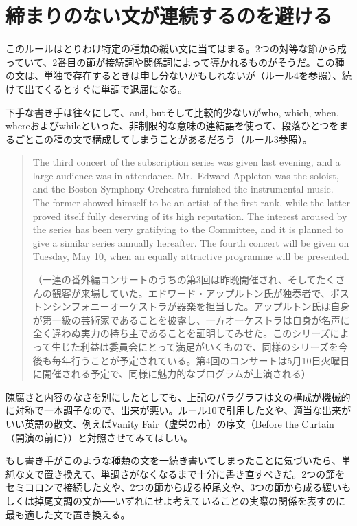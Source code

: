 \section{締まりのない文が連続するのを避ける}
このルールはとりわけ特定の種類の緩い文に当てはまる。2つの対等な節から成っていて、2番目の節が接続詞や関係詞によって導かれるものがそうだ。この種の文は、単独で存在するときは申し分ないかもしれないが（ルール4を参照）、続けて出てくるとすぐに単調で退屈になる。
\par
下手な書き手は往々にして、and, butそして比較的少ないがwho, which, when, whereおよびwhileといった、非制限的な意味の連結語を使って、段落ひとつをまるごとこの種の文で構成してしまうことがあるだろう（ルール3参照）。
\begin{quote}
The third concert of the subscription series was given last
evening, and a large audience was in attendance. Mr.~Edward Appleton was
the soloist, and the Boston Symphony Orchestra furnished the
instrumental music. The former showed himself to be an artist of the
first rank, while the latter proved itself fully deserving of its high
reputation. The interest aroused by the series has been very gratifying
to the Committee, and it is planned to give a similar series annually
hereafter. The fourth concert will be given on Tuesday, May 10, when an
equally attractive programme will be presented.

（一連の番外編コンサートのうちの第3回は昨晩開催され、そしてたくさんの観客が来場していた。エドワード・アップルトン氏が独奏者で、ボストンシンフォニーオーケストラが器楽を担当した。アップルトン氏は自身が第一級の芸術家であることを披露し、一方オーケストラは自身が名声に全く違わぬ実力の持ち主であることを証明してみせた。このシリーズによって生じた利益は委員会にとって満足がいくもので、同様のシリーズを今後も毎年行うことが予定されている。第4回のコンサートは5月10日火曜日に開催される予定で、同様に魅力的なプログラムが上演される）
\end{quote}
陳腐さと内容のなさを別にしたとしても、上記のパラグラフは文の構成が機械的に対称で一本調子なので、出来が悪い。ルール10で引用した文や、適当な出来がいい英語の散文、例えばVanity
Fair（虚栄の市）の序文（Before the
Curtain（開演の前に））と対照させてみてほしい。
\par
もし書き手がこのような種類の文を一続き書いてしまったことに気づいたら、単純な文で置き換えて、単調さがなくなるまで十分に書き直すべきだ。2つの節をセミコロンで接続した文や、2つの節から成る掉尾文や、3つの節から成る緩いもしくは掉尾文調の文か──いずれにせよ考えていることの実際の関係を表すのに最も適した文で置き換える。
